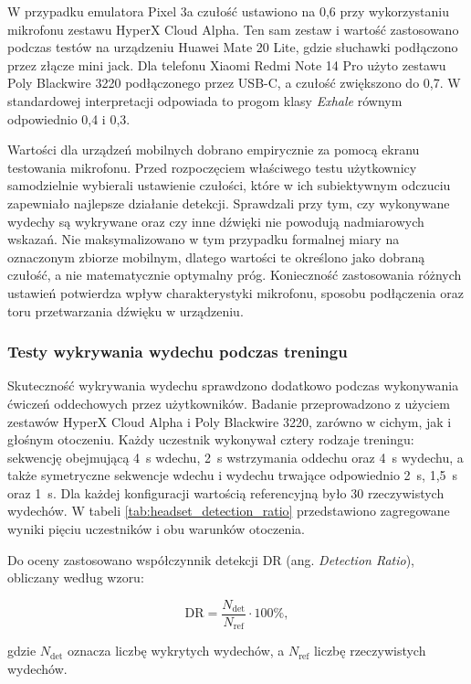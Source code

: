 W przypadku emulatora Pixel 3a czułość ustawiono na 0,6 przy wykorzystaniu mikrofonu zestawu HyperX Cloud Alpha. Ten sam zestaw i wartość zastosowano podczas testów na urządzeniu Huawei Mate 20 Lite, gdzie słuchawki podłączono przez złącze mini jack. Dla telefonu Xiaomi Redmi Note 14 Pro użyto zestawu Poly Blackwire 3220 podłączonego przez USB-C, a czułość zwiększono do 0,7. W standardowej interpretacji odpowiada to progom klasy \textit{Exhale} równym odpowiednio 0,4 i 0,3.

Wartości dla urządzeń mobilnych dobrano empirycznie za pomocą ekranu testowania mikrofonu. Przed rozpoczęciem właściwego testu użytkownicy samodzielnie wybierali ustawienie czułości, które w ich subiektywnym odczuciu zapewniało najlepsze działanie detekcji. Sprawdzali przy tym, czy wykonywane wydechy są wykrywane oraz czy inne dźwięki nie powodują nadmiarowych wskazań. Nie maksymalizowano w tym przypadku formalnej miary na oznaczonym zbiorze mobilnym, dlatego wartości te określono jako dobraną czułość, a nie matematycznie optymalny próg. Konieczność zastosowania różnych ustawień potwierdza wpływ charakterystyki mikrofonu, sposobu podłączenia oraz toru przetwarzania dźwięku w urządzeniu.

\subsubsection{Testy wykrywania wydechu podczas treningu}

Skuteczność wykrywania wydechu sprawdzono dodatkowo podczas wykonywania ćwiczeń oddechowych przez użytkowników. Badanie przeprowadzono z użyciem zestawów HyperX Cloud Alpha i Poly Blackwire 3220, zarówno w cichym, jak i głośnym otoczeniu. Każdy uczestnik wykonywał cztery rodzaje treningu: sekwencję obejmującą 4~s wdechu, 2~s wstrzymania oddechu oraz 4~s wydechu, a także symetryczne sekwencje wdechu i wydechu trwające odpowiednio 2~s, 1,5~s oraz 1~s. Dla każdej konfiguracji wartością referencyjną było 30 rzeczywistych wydechów. W tabeli \ref{tab:headset_detection_ratio} przedstawiono zagregowane wyniki pięciu uczestników i obu warunków otoczenia.

Do oceny zastosowano współczynnik detekcji DR (ang. \textit{Detection Ratio}), obliczany według wzoru:

\begin{equation}
    \mathrm{DR} = \frac{N_{\mathrm{det}}}{N_{\mathrm{ref}}} \cdot 100\%,
\end{equation}

gdzie $N_{\mathrm{det}}$ oznacza liczbę wykrytych wydechów, a $N_{\mathrm{ref}}$ liczbę rzeczywistych wydechów.

